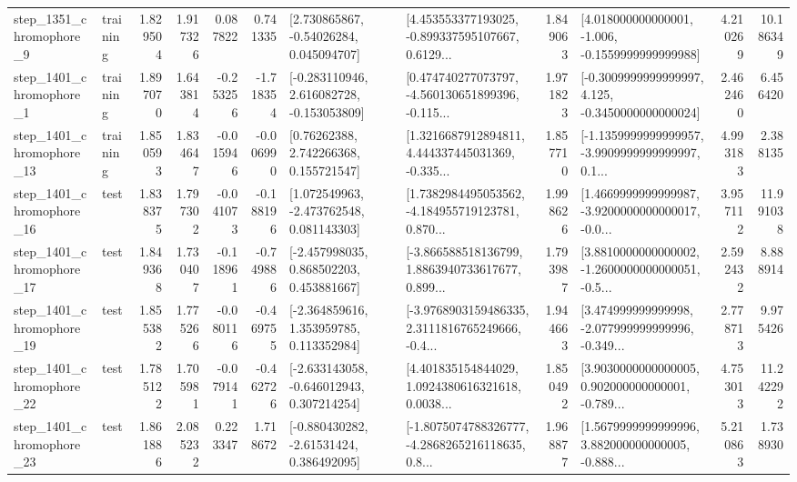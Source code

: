 \begin{tabular}{llrrrrllrlrr}
  step\_1351\_chromophore\_9 &  training &      1.829504 &    1.917326 &      0.087822 &  0.741335 &     [2.730865867, -0.54026284, 0.045094707] &  [4.453553377193025, -0.899337595107667, 0.6129... &       1.849063 &   [4.018000000000001, -1.006, -0.1559999999999988] &            4.210269 &         10.186349 \\
  step\_1401\_chromophore\_1 &  training &      1.897070 &    1.643814 &     -0.253256 & -1.718354 &   [-0.283110946, 2.616082728, -0.153053809] &  [0.474740277073797, -4.560130651899396, -0.115... &       1.971823 &  [-0.3009999999999997, 4.125, -0.3450000000000024] &            2.462460 &          6.456420 \\
 step\_1401\_chromophore\_13 &  training &      1.850593 &    1.834647 &     -0.015946 & -0.006990 &      [0.76262388, 2.742266368, 0.155721547] &  [1.3216687912894811, 4.444337445031369, -0.335... &       1.857710 &  [-1.1359999999999957, -3.9909999999999997, 0.1... &            4.993183 &          2.388135 \\
 step\_1401\_chromophore\_16 &      test &      1.838375 &    1.797302 &     -0.041073 & -0.188196 &    [1.072549963, -2.473762548, 0.081143303] &  [1.7382984495053562, -4.184955719123781, 0.870... &       1.998626 &  [1.4669999999999987, -3.9200000000000017, -0.0... &            3.957112 &         11.991038 \\
 step\_1401\_chromophore\_17 &      test &      1.849368 &    1.730407 &     -0.118961 & -0.749886 &    [-2.457998035, 0.868502203, 0.453881667] &  [-3.866588518136799, 1.8863940733617677, 0.899... &       1.793987 &  [3.8810000000000002, -1.2600000000000051, -0.5... &            2.592432 &          8.888914 \\
 step\_1401\_chromophore\_19 &      test &      1.855382 &    1.775266 &     -0.080116 & -0.469755 &    [-2.364859616, 1.353959785, 0.113352984] &  [-3.9768903159486335, 2.3111816765249666, -0.4... &       1.944663 &  [3.474999999999998, -2.077999999999996, -0.349... &            2.778713 &          9.975426 \\
 step\_1401\_chromophore\_22 &      test &      1.785122 &    1.705981 &     -0.079141 & -0.462726 &   [-2.633143058, -0.646012943, 0.307214254] &  [4.401835154844029, 1.0924380616321618, 0.0038... &       1.850492 &  [3.9030000000000005, 0.902000000000001, -0.789... &            4.753013 &         11.242292 \\
 step\_1401\_chromophore\_23 &      test &      1.861886 &    2.085232 &      0.223347 &  1.718672 &    [-0.880430282, -2.61531424, 0.386492095] &  [-1.8075074788326777, -4.2868265216118635, 0.8... &       1.968877 &  [1.5679999999999996, 3.882000000000005, -0.888... &            5.210863 &          1.738930 \\

\end{tabular}
